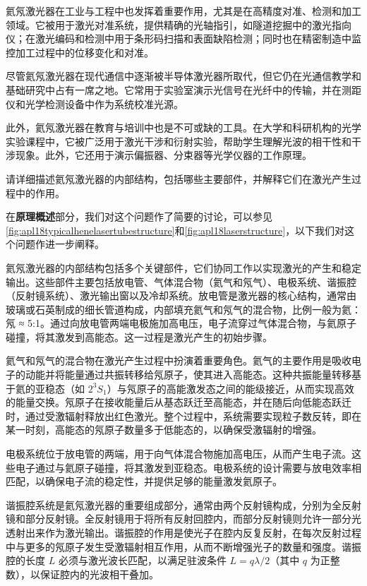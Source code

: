 氦氖激光器在工业与工程中也发挥着重要作用，尤其是在高精度对准、检测和加工领域。它被用于激光对准系统，提供精确的光轴指引，如隧道挖掘中的激光指向仪；在激光编码和检测中用于条形码扫描和表面缺陷检测；同时也在精密制造中监控加工过程中的位移变化和对准。

尽管氦氖激光器在现代通信中逐渐被半导体激光器所取代，但它仍在光通信教学和基础研究中占有一席之地。它常用于实验室演示光信号在光纤中的传输，并在测距仪和光学检测设备中作为系统校准光源。

此外，氦氖激光器在教育与培训中也是不可或缺的工具。在大学和科研机构的光学实验课程中，它被广泛用于激光干涉和衍射实验，帮助学生理解光波的相干性和干涉现象。此外，它还用于演示偏振器、分束器等光学仪器的工作原理。 

\begin{question}
	请详细描述氦氖激光器的内部结构，包括哪些主要部件，并解释它们在激光产生过程中的作用。
\end{question}
在\textbf{原理概述}部分，我们对这个问题作了简要的讨论，可以参见\cref{fig:apl18typicalhenelasertubestructure}和\cref{fig:apl18laserstructure}，以下我们对这个问题作进一步阐释。

氦氖激光器的内部结构包括多个关键部件，它们协同工作以实现激光的产生和稳定输出。这些部件主要包括放电管、气体混合物（氦气和氖气）、电极系统、谐振腔（反射镜系统）、激光输出窗以及冷却系统。放电管是激光器的核心结构，通常由玻璃或石英制成的细长管道构成，内部填充氦气和氖气的混合物，比例一般为氦：氖 ≈ 5:1。通过向放电管两端电极施加高电压，电子流穿过气体混合物，与氦原子碰撞，将其激发到高能态。这一过程是激光产生的初始步骤。

氦气和氖气的混合物在激光产生过程中扮演着重要角色。氦气的主要作用是吸收电子的动能并将能量通过共振转移给氖原子，使其进入高能态。这种共振能量转移基于氦的亚稳态（如 \(2^3S_1\)）与氖原子的高能激发态之间的能级接近，从而实现高效的能量交换。氖原子在接收能量后从基态跃迁至高能态，并在随后向低能态跃迁时，通过受激辐射释放出红色激光。整个过程中，系统需要实现粒子数反转，即在某一时刻，高能态的氖原子数量多于低能态的，以确保受激辐射的增强。

电极系统位于放电管的两端，用于向气体混合物施加高电压，从而产生电子流。这些电子通过与氦原子碰撞，将其激发到亚稳态。电极系统的设计需要与放电效率相匹配，以确保电子流的稳定性，并提供足够的能量激发氦原子。

谐振腔系统是氦氖激光器的重要组成部分，通常由两个反射镜构成，分别为全反射镜和部分反射镜。全反射镜用于将所有反射回腔内，而部分反射镜则允许一部分光透射出来作为激光输出。谐振腔的作用是使光子在腔内反复反射，在每次反射过程中与更多的氖原子发生受激辐射相互作用，从而不断增强光子的数量和强度。谐振腔的长度 \(L\) 必须与激光波长匹配，以满足驻波条件 \(L = q \lambda / 2\)（其中 \(q\) 为正整数），以保证腔内的光波相干叠加。

